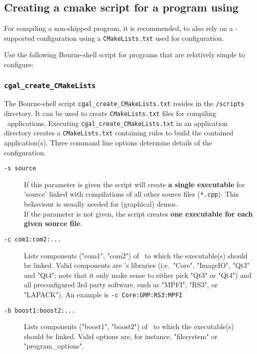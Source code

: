 \subsection{Creating a cmake script for a program using \cgal}

For compiling a non-shipped program, it is
recommended, to also rely on a \cmake-supported configuration using a
\texttt{CMakeLists.txt} used for configuration. 

Use the following Bourne-shell script for programs that are relatively
simple to configure:

\subsubsection{\texttt{cgal\_create\_CMakeLists\label{sec:create_cgal_CMakeLists}}}

The Bourne-shell script \texttt{cgal\_create\_CMakeLists.txt} resides in the
\texttt{\cgalrel/scripts} directory. It can be used to create
\texttt{CMakeLists.txt} files for compiling \cgal\ applications. Executing
\texttt{cgal\_create\_CMakeLists.txt} in an application directory creates a
\texttt{CMakeLists.txt} containing rules to build the contained
application(s). Three command line options determine details of the
configuration.

\begin{description}
\item [\texttt{-s source}] If this parameter is given the script will
  create \textbf{a single executable} for 'source' linked with
  compilations of all other source files (\texttt{*.cpp}). This
  behaviour is usually needed for (graphical) demos. \\
  If the parameter is not given, the script creates \textbf{one executable for each given
  source file}.
\item [\texttt{-c com1:com2:...}] Lists components ("com1",
  "com2") of \cgal\ to which the executable(s) should be linked. Valid components are \cgal's
  libraries (i.e.~"Core", "ImageIO", "Qt3" and "Qt4"; note
  that it only make sense to either pick "Qt3" or "Qt4") and all
  preconfigured 3rd party software, such as "MPFI", "RS3",
  or "LAPACK"). An example is \texttt{-c Core:GMP:RS3:MPFI}

\item [\texttt{-b boost1:boost2:...}] Lists components ("boost1",
  "boost2") of \boost\ to which the executable(s) should be
  linked. Valid options are, for instance, "filesystem" or "program\_options".

\end{description}

